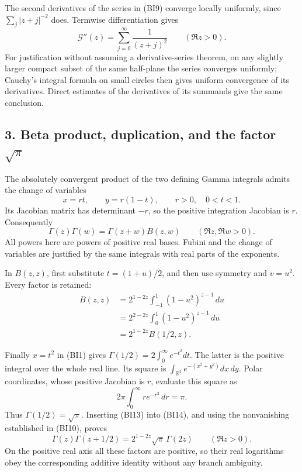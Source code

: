 The second derivatives of the series in (BI9) converge locally uniformly, since \(\sum_j|z+j|^{-2}\) does. Termwise differentiation gives \[
\boxed{
\mathcal G''(z)=\sum_{j=0}^{\infty}\frac1{(z+j)^2}
\qquad(\Re z>0).}
\tag{BI12}
\] For justification without assuming a derivative-series theorem, on any slightly larger compact subset of the same half-plane the series converges uniformly; Cauchy's integral formula on small circles then gives uniform convergence of its derivatives. Direct estimates of the derivatives of its summands give the same conclusion.

\subsection{\texorpdfstring{3. Beta product, duplication, and the factor \(\sqrt\pi\)}{3. Beta product, duplication, and the factor \textbackslash sqrt\textbackslash pi}}\label{GraphV2:beta-product-duplication-and-the-factor-sqrtpi}

The absolutely convergent product of the two defining Gamma integrals admits the change of variables \[
x=rt,\qquad y=r(1-t),\qquad r>0,\quad0<t<1.
\] Its Jacobian matrix has determinant \(-r\), so the positive integration Jacobian is \(r\). Consequently \[
\Gamma(z)\Gamma(w)=\Gamma(z+w)B(z,w)
\qquad(\Re z,\Re w>0).
\tag{BI13}
\] All powers here are powers of positive real bases. Fubini and the change of variables are justified by the same integrals with real parts of the exponents.

In \(B(z,z)\), first substitute \(t=(1+u)/2\), and then use symmetry and \(v=u^2\). Every factor is retained: \[
\begin{split}
B(z,z)
&=2^{1-2z}\int_{-1}^1(1-u^2)^{z-1}\,du\\
&=2^{2-2z}\int_0^1(1-u^2)^{z-1}\,du\\
&=2^{1-2z}B(1/2,z).
\end{split}
\tag{BI14}
\]

Finally \(x=t^2\) in (BI1) gives \(\Gamma(1/2)=2\int_0^\infty e^{-t^2}dt\). The latter is the positive integral over the whole real line. Its square is \(\int_{\mathbb{R}^2}e^{-(x^2+y^2)}dx\,dy\). Polar coordinates, whose positive Jacobian is \(r\), evaluate this square as \[
2\pi\int_0^\infty re^{-r^2}\,dr=\pi.
\] Thus \(\Gamma(1/2)=\sqrt\pi\). Inserting (BI13) into (BI14), and using the nonvanishing established in (BI10), proves \[
\boxed{
\Gamma(z)\Gamma(z+1/2)
=2^{1-2z}\sqrt\pi\,\Gamma(2z)
\qquad(\Re z>0).}
\tag{BI15}
\] On the positive real axis all these factors are positive, so their real logarithms obey the corresponding additive identity without any branch ambiguity.


